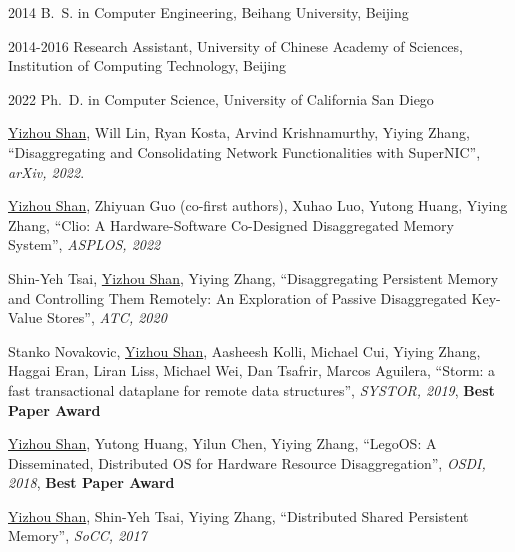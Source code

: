 \begin{frontmatter}
%
\tableofcontents
\listoffigures  %
\listoftables   %



%
%


%
%
\begin{vitapage}
\begin{vita}
  \item[2014] B.~S. in Computer Engineering, Beihang University, Beijing 
  \item[2014-2016] Research Assistant, University of Chinese Academy of Sciences, Institution of Computing Technology, Beijing
  \item[2022] Ph.~D. in Computer Science, University of California San Diego
\end{vita}
\begin{publications}
  \item \underline{Yizhou Shan}, Will Lin, Ryan Kosta, Arvind Krishnamurthy, Yiying Zhang, ``Disaggregating and Consolidating Network Functionalities with SuperNIC'', \textit{arXiv, 2022}.
  \item \underline{Yizhou Shan}, Zhiyuan Guo (co-first authors), Xuhao Luo, Yutong Huang, Yiying Zhang, ``Clio: A Hardware-Software Co-Designed Disaggregated Memory System'', \textit{ASPLOS, 2022}
  \item Shin-Yeh Tsai, \underline{Yizhou Shan}, Yiying Zhang, ``Disaggregating Persistent Memory and Controlling Them Remotely: An Exploration of Passive Disaggregated Key-Value Stores'', \textit{ATC, 2020}
  \item Stanko Novakovic, \underline{Yizhou Shan}, Aasheesh Kolli, Michael Cui, Yiying Zhang, Haggai Eran, Liran Liss, Michael Wei, Dan Tsafrir, Marcos Aguilera, ``Storm: a fast transactional dataplane for remote data structures'', \textit{SYSTOR, 2019}, \textbf{Best Paper Award}
  \item \underline{Yizhou Shan}, Yutong Huang, Yilun Chen, Yiying Zhang, ``LegoOS: A Disseminated, Distributed OS for Hardware Resource Disaggregation'', \textit{OSDI, 2018}, \textbf{Best Paper Award}
  \item \underline{Yizhou Shan}, Shin-Yeh Tsai, Yiying Zhang, ``Distributed Shared Persistent Memory'', \textit{SoCC, 2017}
\end{publications}
\end{vitapage}


%
%


\end{frontmatter}
